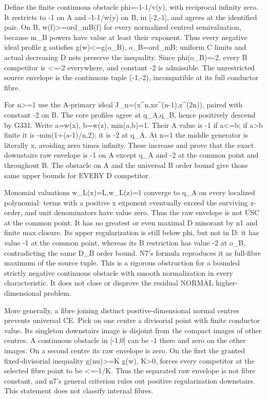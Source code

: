 \documentclass[11pt]{article}
\begin{document}
Define the finite continuous obstacle phi=-1-1/v(y), with reciprocal infinity zero. It restricts to -1 on A and -1-1/w(y) on B, in [-2,-1], and agrees at the identified pair. On B, w(f)>=ord\_mB(f) for every normalized centred semivaluation, because m\_B powers have value at least their exponent. Thus every negative ideal profile g satisfies g(w)<=g(o\_B), o\_B=ord\_mB; uniform C limits and actual decreasing D nets preserve the inequality. Since phi(o\_B)=-2, every B competitor is <=-2 everywhere, and constant -2 is admissible. The unrestricted source envelope is the continuous tuple (-1,-2), incompatible at its full conductor fibre.

For n>=1 use the A-primary ideal J\_n=(x\textasciicircum{}n,xz\textasciicircum{}(n-1),z\textasciicircum{}(2n)), paired with constant -2 on B. The core profiles agree at q\_A,q\_B, hence positively descend by G331. Write a=w(x), b=w(z), min(a,b)=1. Their A value is -1 if a<=b; if a>b finite it is -min(1+(a-1)/n,2); it is -2 at q\_A. At n=1 the middle generator is literally x, avoiding zero times infinity. These increase and prove that the exact downstairs raw envelope is -1 on A except q\_A and -2 at the common point and throughout B. The obstacle on A and the universal B order bound give those same upper bounds for EVERY D competitor.

Monomial valuations w\_L(x)=L,w\_L(z)=1 converge to q\_A on every localized polynomial: terms with a positive x exponent eventually exceed the surviving z-order, and unit denominators have value zero. Thus the raw envelope is not USC at the common point. It has no greatest or even maximal D minorant by n1 and finite max closure. Its upper regularization is still below phi, but not in D: it has value -1 at the common point, whereas its B restriction has value -2 at o\_B, contradicting the same D\_B order bound. N7's formula reproduces it as full-fibre maximum of the source tuple. This is a rigorous obstruction for a bounded strictly negative continuous obstacle with smooth normalization in every characteristic. It does not close or disprove the residual NORMAL higher-dimensional problem.

More generally, a fibre joining distinct positive-dimensional normal centres prevents universal CE. Pick on one centre a divisorial point with finite conductor value. Its singleton downstairs image is disjoint from the compact images of other centres. A continuous obstacle in [-1,0] can be -1 there and zero on the other images. On a second centre its raw envelope is zero. On the first the granted fixed-divisorial inequality g(nu)>=K g(w), K>0, forces every competitor at the selected fibre point to be <=-1/K. Thus the separated raw envelope is not fibre constant, and n7's general criterion rules out positive regularization downstairs. This statement does not classify internal fibres.
\end{document}
